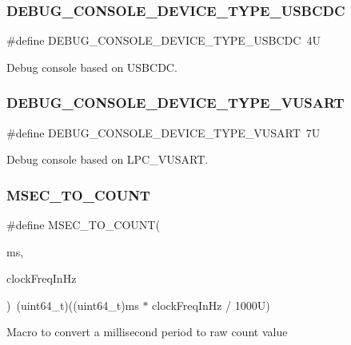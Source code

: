 \subsubsection{\texorpdfstring{DEBUG\_CONSOLE\_DEVICE\_TYPE\_USBCDC}{DEBUG\_CONSOLE\_DEVICE\_TYPE\_USBCDC}}
{\footnotesize\ttfamily \#define D\+E\+B\+U\+G\+\_\+\+C\+O\+N\+S\+O\+L\+E\+\_\+\+D\+E\+V\+I\+C\+E\+\_\+\+T\+Y\+P\+E\+\_\+\+U\+S\+B\+C\+DC~4U}

Debug console based on U\+S\+B\+C\+DC. \mbox{\label{group__ksdk__common_ga2c85202f838f94e51a0bb7b33856c78d}} 
\subsubsection{\texorpdfstring{DEBUG\_CONSOLE\_DEVICE\_TYPE\_VUSART}{DEBUG\_CONSOLE\_DEVICE\_TYPE\_VUSART}}
{\footnotesize\ttfamily \#define D\+E\+B\+U\+G\+\_\+\+C\+O\+N\+S\+O\+L\+E\+\_\+\+D\+E\+V\+I\+C\+E\+\_\+\+T\+Y\+P\+E\+\_\+\+V\+U\+S\+A\+RT~7U}

Debug console based on L\+P\+C\+\_\+\+V\+U\+S\+A\+RT. \mbox{\label{group__ksdk__common_gaa9fb2136029d807bd7c349c30348b52a}} 
\subsubsection{\texorpdfstring{MSEC\_TO\_COUNT}{MSEC\_TO\_COUNT}}
{\footnotesize\ttfamily \#define M\+S\+E\+C\+\_\+\+T\+O\+\_\+\+C\+O\+U\+NT(\begin{DoxyParamCaption}\item[{}]{ms,  }\item[{}]{clock\+Freq\+In\+Hz }\end{DoxyParamCaption})~(uint64\+\_\+t)((uint64\+\_\+t)ms $\ast$ clock\+Freq\+In\+Hz / 1000\+U)}

Macro to convert a millisecond period to raw count value \mbox{\label{group__ksdk__common_ga44d24ac5229dbbd054f046331b58d43b}} 
